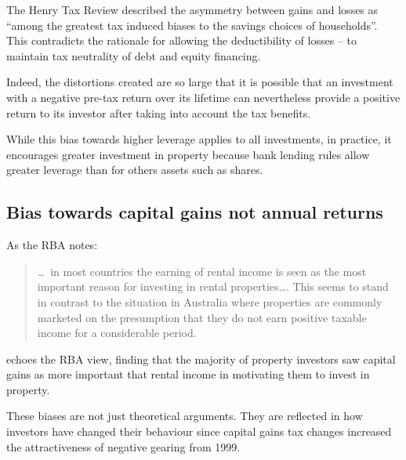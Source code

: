 \documentclass{grattan}\usepackage[]{graphicx}\usepackage[]{color}
\begin{document}
The Henry Tax Review described the asymmetry between gains and losses as ``among the greatest tax induced biases to the savings choices of households''.  This contradicts the rationale for allowing the deductibility of losses -- to maintain tax neutrality of debt and equity financing.

Indeed, the distortions created are so large that it is possible that an investment with a negative pre-tax return over its lifetime can nevertheless provide a positive return to its investor after taking into account the tax benefits.  

While this bias towards higher leverage applies to all investments, in practice, it encourages greater investment in property because bank lending rules allow greater leverage than for others assets such as shares.

\subsection{Bias towards capital gains not annual returns}
As the RBA notes:
\begin{quote}
\dots\ in most countries the earning of rental income is seen as the most important reason for investing in rental properties\dots. This seems to stand in contrast to the situation in Australia where properties are commonly marketed on the presumption that they do not earn positive taxable income for a considerable period.
\end{quote}
\textcite{seelig2009understanding} echoes the RBA view, finding that the majority of property investors saw capital gains as more important that rental income in motivating them to invest in property.


These biases are not just theoretical arguments. They are reflected in how investors have changed their behaviour since capital gains tax changes increased the attractiveness of negative gearing from 1999.
\end{document}

